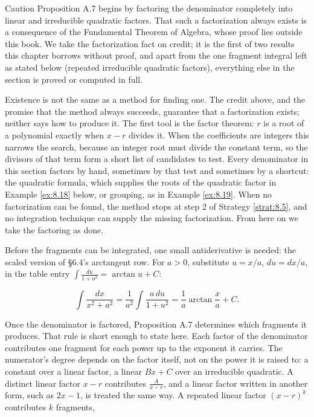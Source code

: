 \documentclass[a4paper,12pt,oneside]{memoir}
\begin{document}
\begin{envcaution}{Caution}{}{}
Proposition A.7 begins by factoring the denominator completely into linear and irreducible quadratic factors. That such a factorization always exists is a consequence of the Fundamental Theorem of Algebra, whose proof lies outside this book. We take the factorization fact on credit; it is the first of two results this chapter borrows without proof, and apart from the one fragment integral left as stated below (repeated irreducible quadratic factors), everything else in the section is proved or computed in full.
\end{envcaution}
Existence is not the same as a method for finding one. The credit above, and the promise that the method always succeeds, guarantee that a factorization exists; neither says how to produce it. The first tool is the factor theorem: \(r\) is a root of a polynomial exactly when \(x - r\) divides it. When the coefficients are integers this narrows the search, because an integer root must divide the constant term, so the divisors of that term form a short list of candidates to test. Every denominator in this section factors by hand, sometimes by that test and sometimes by a shortcut: the quadratic formula, which supplies the roots of the quadratic factor in Example \ref{ex:8.18} below, or grouping, as in Example \ref{ex:8.19}. When no factorization can be found, the method stops at step 2 of Strategy \ref{strat:8.5}, and no integration technique can supply the missing factorization. From here on we take the factoring as done.

Before the fragments can be integrated, one small antiderivative is needed: the scaled version of §6.4’s arctangent row. For \(a > 0\), substitute \(u = x/a\), \(du = dx/a\), in the table entry \(\int\frac{du}{1 + u^{2}} = \arctan u + C\):

\[ \int \frac{dx}{x^{2} + a^{2}} = \frac{1}{a^{2}}\int \frac{a\,du}{1 + u^{2}} = \frac{1}{a}\arctan\frac{x}{a} + C. \tag{8.A} \]

Once the denominator is factored, Proposition A.7 determines which fragments it produces. That rule is short enough to state here. Each factor of the denominator contributes one fragment for each power up to the exponent it carries. The numerator’s degree depends on the factor itself, not on the power it is raised to: a constant over a linear factor, a linear \(Bx + C\) over an irreducible quadratic. A distinct linear factor \(x - r\) contributes \(\frac{A}{x - r}\), and a linear factor written in another form, such as \(2x - 1\), is treated the same way. A repeated linear factor \((x - r)^{k}\) contributes \(k\) fragments,
\end{document}
